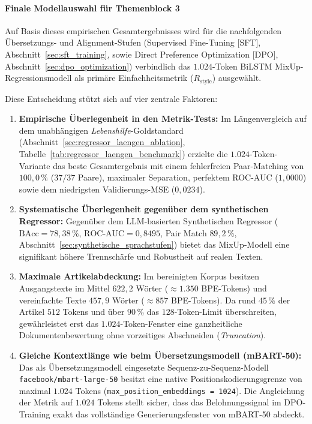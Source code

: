 \paragraph{Finale Modellauswahl für Themenblock 3}
Auf Basis dieses empirischen Gesamtergebnisses wird für die nachfolgenden Übersetzungs- und Alignment-Stufen (Supervised Fine-Tuning [SFT], Abschnitt~\ref{sec:sft_training}, sowie Direct Preference Optimization [DPO], Abschnitt~\ref{sec:dpo_optimization}) verbindlich das $1.024$-Token BiLSTM MixUp-Regressionsmodell als primäre Einfachheitsmetrik ($R_{\text{style}}$) ausgewählt.

Diese Entscheidung stützt sich auf vier zentrale Faktoren:
\begin{enumerate}
    \item \textbf{Empirische Überlegenheit in den Metrik-Tests:} Im Längenvergleich auf dem unabhängigen \textit{Lebenshilfe}-Goldstandard (Abschnitt~\ref{sec:regressor_laengen_ablation}, Tabelle~\ref{tab:regressor_laengen_benchmark}) erzielte die $1.024$-Token-Variante das beste Gesamtergebnis mit einem fehlerfreien Paar-Matching von $100{,}0\,\%$ ($37/37$ Paare), maximaler Separation, perfektem ROC-AUC ($1{,}0000$) sowie dem niedrigsten Validierungs-MSE ($0{,}0234$).
    \item \textbf{Systematische Überlegenheit gegenüber dem synthetischen Regressor:} Gegenüber dem LLM-basierten Synthetischen Regressor ($\text{BAcc} = 78{,}38\,\%$, $\text{ROC-AUC} = 0{,}8495$, Pair Match $89{,}2\,\%$, Abschnitt~\ref{sec:synthetische_sprachstufen}) bietet das MixUp-Modell eine signifikant höhere Trennschärfe und Robustheit auf realen Texten.
    \item \textbf{Maximale Artikelabdeckung:} Im bereinigten Korpus besitzen Ausgangstexte im Mittel $622{,}2$ Wörter ($\approx 1.350$ BPE-Tokens) und vereinfachte Texte $457{,}9$ Wörter ($\approx 857$ BPE-Tokens). Da rund $45\,\%$ der Artikel $512$ Tokens und über $90\,\%$ das $128$-Token-Limit überschreiten, gewährleistet erst das $1.024$-Token-Fenster eine ganzheitliche Dokumentenbewertung ohne vorzeitiges Abschneiden (\textit{Truncation}).
    \item \textbf{Gleiche Kontextlänge wie beim Übersetzungsmodell (mBART-50):} Das als Übersetzungsmodell eingesetzte Sequenz-zu-Sequenz-Modell \texttt{facebook/mbart-large-50} \citep{tang2020multilingual, liu2020multilingual} besitzt eine native Positionskodierungsgrenze von maximal $1.024$ Tokens (\texttt{max\_position\_embeddings = 1024}). Die Angleichung der Metrik auf $1.024$ Tokens stellt sicher, dass das Belohnungssignal im DPO-Training exakt das vollständige Generierungsfenster von mBART-50 abdeckt.
\end{enumerate}
